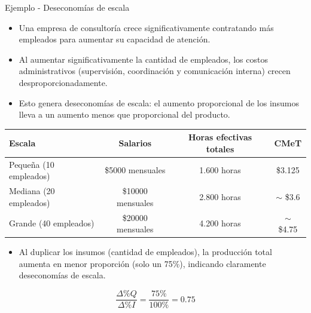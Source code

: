 \documentclass{beamer}
\begin{document}
\begin{frame}{Ejemplo - Deseconomías de escala}
    \begin{itemize}
        \item Una empresa de consultoría crece significativamente contratando más empleados para aumentar su capacidad de atención.
        \item Al aumentar significativamente la cantidad de empleados, los costos administrativos (supervisión, coordinación y comunicación interna) crecen desproporcionadamente.
        \item Esto genera deseconomías de escala: el aumento proporcional de los insumos lleva a un aumento menos que proporcional del producto.
    \end{itemize}

    \begin{table}[h]
    \centering
    \renewcommand{\arraystretch}{1} %
    \begin{adjustbox}{width=0.8\textwidth}
    \begin{tabular}{lccc}
    \toprule
    \textbf{Escala} & \textbf{Salarios} & \textbf{Horas efectivas totales} & \textbf{CMeT} \\
    \midrule
    Pequeña (10 empleados)  & \$5000 mensuales  & 1.600 horas & \$3.125 \\
    Mediana (20 empleados)  & \$10000 mensuales  & 2.800 horas & $\sim$ \$3.6 \\
    Grande (40 empleados)   & \$20000 mensuales  & 4.200 horas & $\sim$ \$4.75 \\
    \bottomrule
    \end{tabular}
    \end{adjustbox}
    \end{table}

    \centering
    \begin{itemize}
        \item Al duplicar los insumos (cantidad de empleados), la producción total aumenta en menor proporción (solo un 75\%), indicando claramente deseconomías de escala.
    \end{itemize}

    \[
    \frac{\Delta \% Q}{\Delta \% I} = \frac{75\%}{100\%} = 0.75
    \]
\end{frame}
\end{document}

